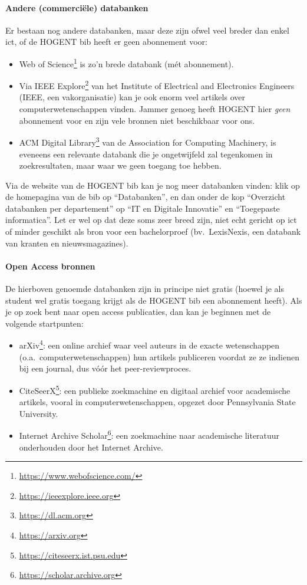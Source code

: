 \paragraph{Andere (commerciële) databanken}

Er bestaan nog andere databanken, maar deze zijn ofwel veel breder dan enkel ict, of de HOGENT bib heeft er geen abonnement voor:

\begin{itemize}
  \item Web of Science\footnote{\url{https://www.webofscience.com/}} is zo'n brede databank (mét abonnement).
  \item Via IEEE Explore\footnote{\url{https://ieeexplore.ieee.org}} van het Institute of Electrical and Electronics Engineers (IEEE, een vakorganisatie) kan je ook enorm veel artikels over computerwetenschappen vinden. Jammer genoeg heeft HOGENT hier \textit{geen} abonnement voor en zijn vele bronnen niet beschikbaar voor ons.
  \item ACM Digital Library\footnote{\url{https://dl.acm.org}} van de Association for Computing Machinery, is eveneens een relevante databank die je ongetwijfeld zal tegenkomen in zoekresultaten, maar waar we geen toegang toe hebben.
\end{itemize}

Via de website van de HOGENT bib kan je nog meer databanken vinden: klik op de homepagina van de bib op ``Databanken'', en dan onder de kop ``Overzicht databanken per departement'' op ``IT en Digitale Innovatie'' en ``Toegepaste informatica''. Let er wel op dat deze soms zeer breed zijn, niet echt gericht op ict of minder geschikt als bron voor een bachelorproef (bv.\ LexisNexis, een databank van kranten en nieuwsmagazines).

\paragraph{Open Access bronnen}

De hierboven genoemde databanken zijn in principe niet gratis (hoewel je als student wel gratis toegang krijgt als de HOGENT bib een abonnement heeft). Als je op zoek bent naar open access publicaties, dan kan je beginnen met de volgende startpunten:

\begin{itemize}
  \item arXiv\footnote{\url{https://arxiv.org}}: een online archief waar veel auteurs in de exacte wetenschappen (o.a.\ computerwetenschappen) hun artikels publiceren voordat ze ze indienen bij een journal, dus vóór het peer-reviewproces.
  \item CiteSeerX\footnote{\url{https://citeseerx.ist.psu.edu}}: een publieke zoekmachine en digitaal archief voor academische artikels, vooral in computerwetenschappen, opgezet door Pennsylvania State University.
  \item Internet Archive Scholar\footnote{\url{https://scholar.archive.org}}: een zoekmachine naar academische literatuur onderhouden door het Internet Archive.
\end{itemize}

